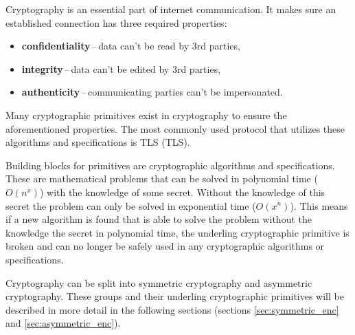 Cryptography is an essential part of internet communication. It makes sure an established connection has three required properties\cite{Bernstein149}:
\begin{itemize}
  \item \textbf{confidentiality}\,--\,data can't be read by 3rd parties,
  \item \textbf{integrity}\,--\,data can't be edited by 3rd parties,
  \item \textbf{authenticity}\,--\,communicating parties can't be impersonated.
\end{itemize}
Many cryptographic primitives exist in cryptography to ensure the aforementioned properties. The most commonly used protocol that utilizes these algorithms and specifications is TLS (\acl{TLS}).

Building blocks for primitives are cryptographic algorithms and specifications. These are mathematical problems that can be solved in polynomial time ($O(n^x)$) with the knowledge of some secret. Without the knowledge of this secret the problem can only be solved in exponential time ($O(x^n)$). This means if a new algorithm is found that is able to solve the problem without the knowledge the secret in polynomial time, the underling cryptographic primitive is broken and can no longer be safely used in any cryptographic algorithms or specifications.\cite{Smart2004}

Cryptography can be split into symmetric cryptography and asymmetric cryptography. These groups and their underling cryptographic primitives will be described in more detail in the following sections (sections \ref{sec:symmetric_enc} and \ref{sec:asymmetric_enc}).
